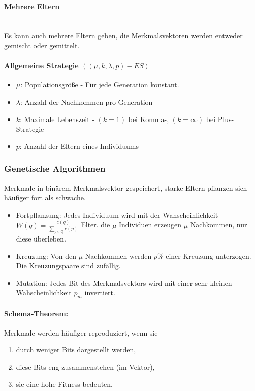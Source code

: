 \paragraph{Mehrere Eltern}
\text{ }\\Es kann auch mehrere Eltern geben, die Merkmalsvektoren werden entweder gemischt oder gemittelt.


\paragraph{Allgemeine Strategie $((\mu, k, \lambda, p) - ES)$}
\begin{itemize}
	\item \(\mu\): Populationsgröße - Für jede Generation konstant.
	\item \(\lambda\): Anzahl der Nachkommen pro Generation
	\item \(k\): Maximale Lebenszeit - \((k = 1)\) bei Komma-, \((k=\infty)\) bei Plus-Strategie
	\item \(p\): Anzahl der Eltern eines Individuums
\end{itemize}

\subsubsection{Genetische Algorithmen}
Merkmale in binärem Merkmalsvektor gespeichert, starke Eltern pflanzen sich häufiger fort als schwache.

\begin{itemize}
	\item Fortpflanzung: Jedes Individuum wird mit der Wahscheinlichkeit \(W(q) = \frac{c(q)}{\sum\limits_{p \in Q}c(p)}\) Elter. die \(\mu\) Individuen erzeugen \(\mu\) Nachkommen, nur diese überleben.
	\item Kreuzung: Von den \(\mu\) Nachkommen werden \(p\%\) einer Kreuzung unterzogen. Die Kreuzungspaare sind zufällig.
	\item Mutation: Jedes Bit des Merkmalsvektors wird mit einer sehr kleinen Wahscheinlichkeit \(p_m\) invertiert.
\end{itemize}

\paragraph{Schema-Theorem:} Merkmale werden häufiger reproduziert, wenn sie 
\begin{enumerate}
	\item durch weniger Bits dargestellt werden,
	\item diese Bits eng zusammenstehen (im Vektor),
	\item sie eine hohe Fitness bedeuten.
\end{enumerate}

